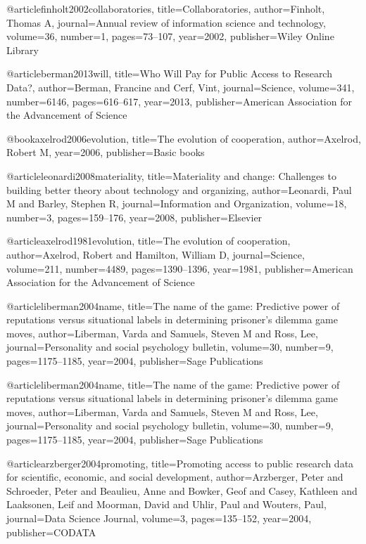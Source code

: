 @article{finholt2002collaboratories,
  title={Collaboratories},
  author={Finholt, Thomas A},
  journal={Annual review of information science and technology},
  volume={36},
  number={1},
  pages={73--107},
  year={2002},
  publisher={Wiley Online Library}
}

@article{berman2013will,
  title={Who Will Pay for Public Access to Research Data?},
  author={Berman, Francine and Cerf, Vint},
  journal={Science},
  volume={341},
  number={6146},
  pages={616--617},
  year={2013},
  publisher={American Association for the Advancement of Science}
}

@book{axelrod2006evolution,
  title={The evolution of cooperation},
  author={Axelrod, Robert M},
  year={2006},
  publisher={Basic books}
}


@article{leonardi2008materiality,
  title={Materiality and change: Challenges to building better theory about technology and organizing},
  author={Leonardi, Paul M and Barley, Stephen R},
  journal={Information and Organization},
  volume={18},
  number={3},
  pages={159--176},
  year={2008},
  publisher={Elsevier}
}

@article{axelrod1981evolution,
  title={The evolution of cooperation},
  author={Axelrod, Robert and Hamilton, William D},
  journal={Science},
  volume={211},
  number={4489},
  pages={1390--1396},
  year={1981},
  publisher={American Association for the Advancement of Science}
}


@article{liberman2004name,
  title={The name of the game: Predictive power of reputations versus situational labels in determining prisoner’s dilemma game moves},
  author={Liberman, Varda and Samuels, Steven M and Ross, Lee},
  journal={Personality and social psychology bulletin},
  volume={30},
  number={9},
  pages={1175--1185},
  year={2004},
  publisher={Sage Publications}
}


@article{liberman2004name,
  title={The name of the game: Predictive power of reputations versus situational labels in determining prisoner’s dilemma game moves},
  author={Liberman, Varda and Samuels, Steven M and Ross, Lee},
  journal={Personality and social psychology bulletin},
  volume={30},
  number={9},
  pages={1175--1185},
  year={2004},
  publisher={Sage Publications}
}


@article{arzberger2004promoting,
  title={Promoting access to public research data for scientific, economic, and social development},
  author={Arzberger, Peter and Schroeder, Peter and Beaulieu, Anne and Bowker, Geof and Casey, Kathleen and Laaksonen, Leif and Moorman, David and Uhlir, Paul and Wouters, Paul},
  journal={Data Science Journal},
  volume={3},
  pages={135--152},
  year={2004},
  publisher={CODATA}
}


